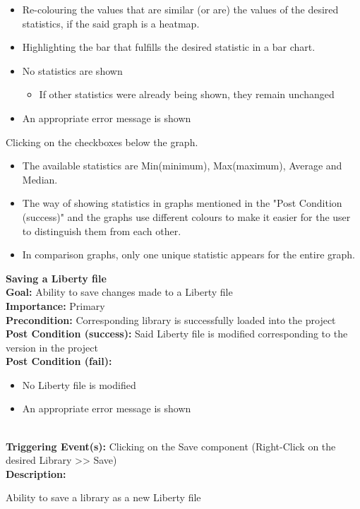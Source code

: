 \documentclass[10pt,a4paper]{report}
\newcommand{\precondition}[1]{
    \textbf{Precondition: } #1 \leavevmode \\
}
\newcommand{\FRDescription}[8]{
    \textbf{#1} \leavevmode \\
    \textbf{Goal: } #2 \leavevmode \\
    \textbf{Importance: } #3 \leavevmode \\
    \precondition{#4}
    \textbf{Post Condition (success): } #5 \leavevmode \\
    \textbf{Post Condition (fail): } #6 \leavevmode \\
    \textbf{Triggering Event(s): } #7 \leavevmode \\
    \textbf{Description: } \leavevmode \\ 
    #8}
\begin{document}
\begin{FR}
{\begin{itemize}
        \item Re-colouring the values that are similar (or are) the values of the desired statistics, if the said graph is a heatmap.
        \item Highlighting the bar that fulfills the desired statistic in a bar chart.
    \end{itemize}}
    {\begin{itemize}
        \item No statistics are shown
        \begin{itemize}
            \item If other statistics were already being shown, they remain unchanged
        \end{itemize}
        \item An appropriate error message is shown
    \end{itemize}}
    {Clicking on the checkboxes below the graph.}
    {\begin{itemize}
        \item The available statistics are Min(minimum), Max(maximum), Average and Median.
        \item The way of showing statistics in graphs mentioned in the "Post Condition (success)" and the graphs use different colours to make it easier for the user to distinguish them from each other.
        \item In comparison graphs, only one unique statistic appears for the entire graph.
    \end{itemize}}
    \item \FRDescription{Saving a Liberty file\label{FR-20}}
    {Ability to save changes made to a Liberty file}
    {Primary}
    {Corresponding library is successfully loaded into the project}
    {Said Liberty file is modified corresponding to the version in the project}
    {\begin{itemize}
        \item No Liberty file is modified
        \item An appropriate error message is shown
    \end{itemize}}
    {Clicking on the Save component (Right-Click on the desired Library  >> Save)}
    \item {}
    {Ability to save a library as a new Liberty file}

\end{FR}
\end{document}

